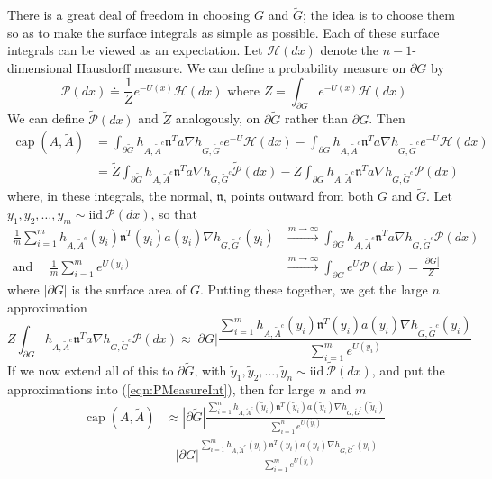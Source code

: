 \documentclass[12pt, nofootinbib,english, amsmath, amssymb, aps, priprint, graphicx,floatfix]{revtex4-1}
\theoremstyle{plain}
\theoremstyle{definition}
\theoremstyle{plain}
\newcommand{\normal}{{\mathfrak{n}}}
\newcommand{\capac}[2]{\ensuremath{\operatorname{cap}}(#1,#2)}
\newcommand{\hausdorffmeasure}{\mathscr{H}(dx)}
\newcommand{\PMeasure}{\mathscr{P}(dx)}
\newcommand{\tPMeasure}{\tilde{\mathscr P}(dx)}
\begin{document}
There is a great deal of freedom in choosing $G$ and $\tilde G$; the idea is to choose them so as to make the surface integrals as simple as possible.  Each of these surface integrals can be viewed as an expectation.  Let $\hausdorffmeasure$ denote the $n-1$-dimensional Hausdorff measure.  We can define a probability measure on
$\partial G$ by
\[
\PMeasure\doteq\frac{1}{Z}e^{-U(x)}\hausdorffmeasure
\text{   where   }
Z= \int_{\partial G} e^{-U(x)}\hausdorffmeasure
\]
We can define $\tPMeasure$
and $\tilde{Z}$ analogously, on $\partial\tilde{G}$ rather than $\partial G$.
Then
\begin{align}
\capac{A}{\tilde A} & = \int_{\partial\tilde{G}} h_{A, \tilde{A}^c}    \normal^T a  \nabla h_{G, \tilde{G}^c} e^{- U } \hausdorffmeasure
-\int_{\partial G} h_{A, \tilde{A}^c}    \normal^T a  \nabla h_{G, \tilde{G}^c} e^{- U } \hausdorffmeasure
\nonumber \\
&=\tilde Z
\int_{\partial\tilde{G}} h_{A, \tilde{A}^c}    \normal^T a  \nabla h_{G, \tilde{G}^c} \tPMeasure
-Z
\int_{\partial G} h_{A, \tilde{A}^c}    \normal^T a
\nabla h_{G,\tilde{G}^c} \PMeasure
\label{eqn:PMeasureInt}
\end{align}
where, in these integrals, the normal, $\normal$, points outward from both $G$ and $\tilde G$.
Let $y_1,y_2,\dots,y_m\sim \text{iid}\ \PMeasure$, so that
\begin{align*}
\frac{1}{m}\sum_{i=1}^m
h_{A, \tilde{A}^c}(y_i) \normal^T(y_i) a(y_i)  \nabla h_{G,\tilde{G}^c}(y_i) & \stackrel{m\to\infty}{\longrightarrow}
 \int_{\partial G} h_{A, \tilde{A}^c}    \normal^T a
\nabla h_{G,\tilde{G}^c} \PMeasure \\
\text{and}\ \ \ \ \ \ \frac{1}{m}\sum_{i=1}^m e^{U(y_i)}
& \stackrel{m\to\infty}{\longrightarrow} \int_{\partial G} e^U
\PMeasure = \frac{|\partial G|}{Z}
\end{align*}
where $|\partial G|$ is the surface area of $G$. Putting these together, we get the large $n$ approximation
\[
Z
\int_{\partial G} h_{A, \tilde{A}^c}    \normal^T a
\nabla h_{G,\tilde{G}^c} \PMeasure
\approx
|\partial G|
\frac{\sum_{i=1}^m
h_{A, \tilde{A}^c}(y_i) \normal^T(y_i) a(y_i)  \nabla h_{G,\tilde{G}^c}(y_i)}
{\sum_{i=1}^m e^{U(y_i)}}
\]
If we now extend all of this to $\partial\tilde{G}$, with
$\tilde{y}_1,\tilde{y}_2,\dots,\tilde{y}_n\sim \text{iid}\ \tPMeasure$, and put the approximations into
(\ref{eqn:PMeasureInt}), then for large $n$ and $m$
\begin{align}
\capac{A}{\tilde A} & \approx
|\partial\tilde{G}|
\frac{\sum_{i=1}^n
h_{A, \tilde{A}^c}(\tilde{y}_i) \normal^T(\tilde{y}_i) a(\tilde{y}_i)  \nabla h_{G,\tilde{G}^c}(\tilde{y}_i)}
{\sum_{i=1}^n e^{U(\tilde{y}_i)}}
\label{eqn:approximate_capacity}\\
& -|\partial G|
\frac{\sum_{i=1}^m
h_{A, \tilde{A}^c}(y_i) \normal^T(y_i) a(y_i)  \nabla h_{G,\tilde{G}^c}(y_i)}
{\sum_{i=1}^m e^{U(y_i)}}
\nonumber
\end{align}
\end{document}
